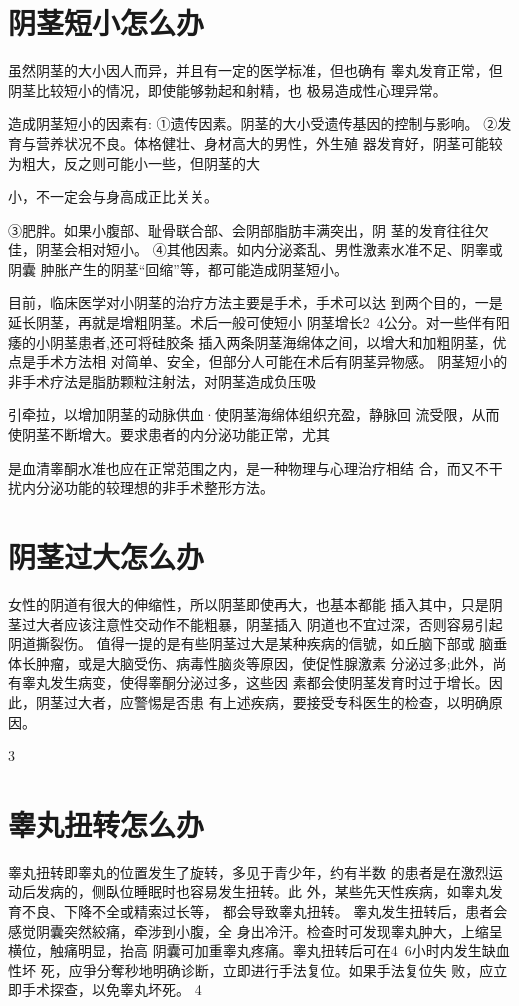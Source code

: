 \documentclass[12pt,UTF8]{ctexbook}
\begin{document}
\section{阴茎短小怎么办}
虽然阴茎的大小因人而异，并且有一定的医学标准，但也确有
睾丸发育正常，但阴茎比较短小的情况，即使能够勃起和射精，也
极易造成性心理异常。

造成阴茎短小的因素有:
①遗传因素。阴茎的大小受遗传基因的控制与影响。
②发育与营养状况不良。体格健壮、身材高大的男性，外生殖
器发育好，阴茎可能较为粗大，反之则可能小一些，但阴茎的大

小，不一定会与身高成正比关关。

③肥胖。如果小腹部、耻骨联合部、会阴部脂肪丰满突出，阴
茎的发育往往欠佳，阴茎会相对短小。
④其他因素。如内分泌紊乱、男性激素水准不足、阴睾或阴囊
肿胀产生的阴茎“回缩”等，都可能造成阴茎短小。

目前，临床医学对小阴茎的治疗方法主要是手术，手术可以达
到两个目的，一是延长阴茎，再就是增粗阴茎。术后一般可使短小
阴茎增长2~4公分。对一些伴有阳痿的小阴茎患者,还可将硅胶条
插入两条阴茎海绵体之间，以增大和加粗阴茎，优点是手术方法相
对简单、安全，但部分人可能在术后有阴茎异物感。
阴茎短小的非手术疗法是脂肪颗粒注射法，对阴茎造成负压吸

引牵拉，以增加阴茎的动脉供血·使阴茎海绵体组织充盈，静脉回
流受限，从而使阴茎不断增大。要求患者的内分泌功能正常，尤其

是血清睾酮水准也应在正常范围之内，是一种物理与心理治疗相结
合，而又不干扰内分泌功能的较理想的非手术整形方法。

\section{阴茎过大怎么办}
女性的阴道有很大的伸缩性，所以阴茎即使再大，也基本都能
插入其中，只是阴茎过大者应该注意性交动作不能粗暴，阴茎插入
阴道也不宜过深，否则容易引起阴道撕裂伤。
值得一提的是有些阴茎过大是某种疾病的信號，如丘脑下部或
脑垂体长肿瘤，或是大脑受伤、病毒性脑炎等原因，使促性腺激素
分泌过多;此外，尚有睾丸发生病变，使得睾酮分泌过多，这些因
素都会使阴茎发育时过于增长。因此，阴茎过大者，应警惕是否患
有上述疾病，要接受专科医生的检查，以明确原因。

3
\section{睾丸扭转怎么办}
睾丸扭转即睾丸的位置发生了旋转，多见于青少年，约有半数
的患者是在激烈运动后发病的，侧臥位睡眠时也容易发生扭转。此
外，某些先天性疾病，如睾丸发育不良、下降不全或精索过长等，
都会导致睾丸扭转。
睾丸发生扭转后，患者会感觉阴囊突然絞痛，牵涉到小腹，全
身出冷汗。检查时可发现睾丸肿大，上缩呈横位，触痛明显，抬高
阴囊可加重睾丸疼痛。睾丸扭转后可在4~6小时内发生缺血性坏
死，应爭分奪秒地明确诊断，立即进行手法复位。如果手法复位失
败，应立即手术探查，以免睾丸坏死。
4
\end{document}
